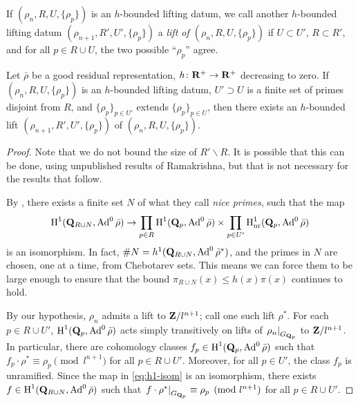 If $(\rho_n,R,U,\{\rho_p\})$ is an $h$-bounded lifting datum, we call 
another $h$-bounded lifting datum $(\rho_{n+1},R',U',\{\rho_p\})$ a \emph{lift 
of $(\rho_n,R,U,\{\rho_p\})$} if $U\subset U'$, $R\subset R'$, and for all 
$p\in R\cup U$, the two possible ``$\rho_p$'' agree. 

\begin{theorem}\label{thm:lifting-datum}
Let $\bar\rho$ be a good residual representation, $h\colon \mathbf{R}^+ \to \mathbf{R}^+$ 
decreasing to zero. If $(\rho_n,R,U,\{\rho_p\})$ is an $h$-bounded lifting 
datum, $U'\supset U$ is a finite set of primes disjoint from $R$, and 
$\{\rho_p\}_{p\in U'}$ extends $\{\rho_p\}_{p\in U}$, then there exists an 
$h$-bounded lift $(\rho_{n+1},R',U',\{\rho_p\})$ of 
$(\rho_n,R,U,\{\rho_p\})$. 
\end{theorem}
\begin{proof}
Note that we do not bound the size of $R'\smallsetminus R$. It is possible that 
this can be done, using unpublished results of Ramakrishna, but that is not 
necessary for the results that follow. 

By \cite[Lem.~8]{khare-larsen-ramakrishna-2005}, there exists a finite set 
$N$ of what they call \emph{nice primes}, such that the map 
\begin{equation}\label{eq:h1-isom}
	\operatorname{H}^1(\mathbf{Q}_{R\cup N},\operatorname{Ad}^0\bar\rho) \to \prod_{p\in R} \operatorname{H}^1(\mathbf{Q}_p,\operatorname{Ad}^0\bar\rho) \times \prod_{p\in U'} \operatorname{H}_{\mathrm{nr}}^1(\mathbf{Q}_p,\operatorname{Ad}^0\bar\rho) 
\end{equation}
is an isomorphism. In fact, $\# N = h^1(\mathbf{Q}_{R\cup N},\operatorname{Ad}^0\bar\rho^\ast)$, and 
the primes in $N$ are chosen, one at a time, from Chebotarev sets. This means we 
can force them to be large enough to ensure that the bound 
$\pi_{R\cup N}(x) \leqslant h(x) \pi(x)$ continues to hold. 

By our hypothesis, $\rho_n$ admits a lift to $\mathbf{Z}/l^{n+1}$; call one such lift 
$\rho^\ast$. For each $p\in R\cup U'$, $\operatorname{H}^1(\mathbf{Q}_p,\operatorname{Ad}^0\bar\rho)$ acts simply 
transitively on lifts of $\left.\rho_n\right|_{G_{\mathbf{Q}_p}}$ to $\mathbf{Z}/l^{n+1}$. In 
particular, there are cohomology classes $f_p\in \operatorname{H}^1(\mathbf{Q}_p,\operatorname{Ad}^0\bar\rho)$ 
such that $f_p\cdot \rho^\ast \equiv \rho_p\pmod{l^{n+1}}$ for all 
$p\in R\cup U'$. Moreover, for all $p\in U'$, the class $f_p$ is unramified. 
Since the map in \eqref{eq:h1-isom} is an isomorphism, there exists 
$f\in \operatorname{H}^1(\mathbf{Q}_{R\cup N},\operatorname{Ad}^0\bar\rho)$ such that 
$\left.f\cdot \rho^\ast\right|_{G_{\mathbf{Q}_p}}\equiv \rho_p\pmod{l^{n+1}}$ for all 
$p\in R\cup U'$. 


\end{proof}
